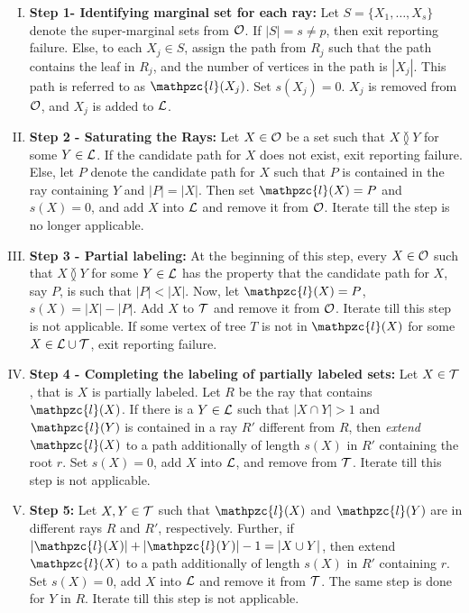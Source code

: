 \documentclass[envcountsect, envcountsame, 11pt]{../lib/llncs2e/llncs}
\def\cL{{\cal L}}
\def\cO{{\cal O}}
\def\cT{{\cal T}}
\def\cl{\mathpzc{l}}
\def\overlap{\between}
\begin{document}
\noindent
\begin{enumerate}[I.]
\item {\bf Step 1- Identifying marginal set for each ray:} Let $S=\{X_1,\ldots,X_s\}$ denote the
  super-marginal sets from $\cO$.  If $|S|=s \neq p$, then
  exit reporting failure.  Else,  to each $X_j \in S$, assign the path
  from $R_j$ such that the path contains the leaf in $R_j$, and the number of vertices in the path is $|X_j|$.  This path
  is referred to as $\cl(X_j)$.  
  Set $s(X_j)=0$.  $X_j$ is removed from $\cO$, and $X_j$ is added to $\cL$.  
  \item {\bf Step 2 - Saturating the Rays:}  Let $X \in \cO$ be a set such that  $X \overlap Y$ for some $Y \in \cL$.  If the candidate path for $X$ does not exist, exit
  reporting failure. Else, let $P$ denote the candidate path for $X$ such that $P$ is contained in the ray containing $Y$ and $|P|=|X|$.
Then  
   set $\cl(X)=P$ and $s(X)=0$, and add $X$ into $\cL$ and remove it from $\cO$.  Iterate till the step is no longer applicable.
   \item {\bf Step 3 - Partial labeling:} At the beginning of this step, every $X \in \cO$ such that $X \overlap Y$ for some $Y \in \cL$ has the property that the candidate path for $X$, say $P$, is such that $|P| < |X|$.
Now, let $\cl(X)=P$, $s(X)=|X|-|P|$.     Add $X$ to $\cT$ and remove it from $\cO$.    Iterate till this step is not applicable.  If some vertex of tree $T$ is not in $\cl(X)$ for some $X \in \cL \cup \cT$, exit reporting failure.
   \item {\bf Step 4 - Completing the labeling of partially labeled sets:}    Let $X \in \cT$, that is $X$ is partially labeled.  Let $R$ be the ray that contains $\cl(X)$.   If there is a $Y \in \cL$ such that $|X \cap Y| > 1$ and $\cl(Y)$ is contained in a ray $R'$ different from $R$, then {\em extend} $\cl(X)$ to a path additionally of length $s(X)$ in $R'$ containing the root $r$.  Set $s(X)=0$, add $X$ into $\cL$, and remove from $\cT$.  Iterate till this step is not applicable. 
   \item {\bf Step 5:} Let $X, Y  \in \cT$ such that $\cl(X)$ and $\cl(Y)$ are in different rays $R$ and $R'$, respectively. Further, if $|\cl(X)|+|\cl(Y)|-1 = |X \cup Y|$, then extend $\cl(X)$ to a path additionally of length $s(X)$ in $R'$ containing $r$.  Set $s(X)=0$, add $X$ into $\cL$ and remove it from $\cT$.  The same step is done for $Y$ in $R$.  Iterate till this step is not applicable.

\end{enumerate}
\end{document}
